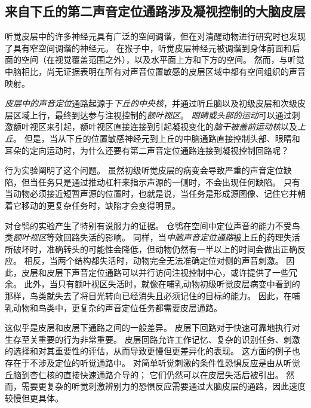 \subsection{来自下丘的第二声音定位通路涉及凝视控制的大脑皮层}

听觉皮层中的许多神经元具有广泛的空间调谐，但在对清醒动物进行研究时也发现了具有窄空间调谐的神经元。
在猴子中，听觉皮层神经元被调谐到身体前面和后面的空间（在视觉覆盖范围之外），以及水平面上方和下方的空间。
然而，与听觉中脑相比，尚无证据表明在所有对声音位置敏感的皮层区域中都有空间组织的声音映射。


\textit{皮层中的声音定位}通路起源于\textit{下丘的中央核}，并通过听丘脑以及初级皮层和次级皮层区域上行，最终到达参与注视控制的\textit{额叶视区}。
\textit{眼睛或头部的运动}可以通过刺激额叶视区来引起，额叶视区直接连接到引起凝视变化的\textit{脑干被盖前运动核}以及\textit{上丘}。
但是，当从下丘的位置敏感神经元到上丘的中脑通路直接控制头部、眼睛和耳朵的定向运动时，为什么还要有第二声音定位通路连接到凝视控制回路呢？


行为实验阐明了这个问题。
虽然初级听觉皮层的病变会导致严重的声音定位缺陷，但当任务只是通过推动杠杆来指示声源的一侧时，不会出现任何缺陷。
只有当动物必须接近短暂声源的位置时，也就是说，当任务是形成源图像、记住它并朝着它移动的更复杂任务时，缺陷才会变得明显。



对仓鸮的实验产生了特别有说服力的证据。
仓鸮在空间中定位声音的能力不受鸟类\textit{额叶视区}等效回路失活的影响。
同样，当\textit{中脑声音定位通路}被上丘的药理失活所破坏时，准确转头的可能性会降低，但动物仍然有一半以上的时间会做出正确反应。
相反，当两个结构都失活时，动物完全无法准确定位对侧的声音刺激。
因此，皮层和皮层下声音定位通路可以并行访问注视控制中心，或许提供了一些冗余。
此外，当只有额叶视区失活时，就像在哺乳动物初级听觉皮层病变中看到的那样，鸟类就失去了将目光转向已经消失且必须记住的目标的能力。
因此，在哺乳动物和鸟类中，更复杂的声音定位任务都需要皮层通路。


这似乎是皮层和皮层下通路之间的一般差异。
皮层下回路对于快速可靠地执行对生存至关重要的行为非常重要。
皮层回路允许工作记忆、复杂的识别任务、刺激的选择和对其重要性的评估，从而导致更慢但更差异化的表现。
这方面的例子也存在于不涉及定位的听觉通路中。
对简单听觉刺激的条件性恐惧反应是由从听觉丘脑到杏仁核的直接快速通路介导的；
它们仍然可以在皮层失活后被引出。
然而，需要更复杂的听觉刺激辨别力的恐惧反应需要通过大脑皮层的通路，因此速度较慢但更具体。




